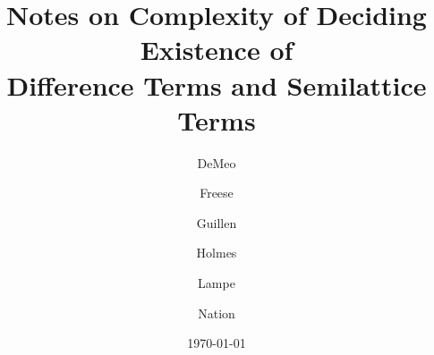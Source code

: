\theoremstyle{plain}
\newtheorem{thm}{Theorem}[section]
\newtheorem{lem}[thm]{Lemma}
\newtheorem{prop}[thm]{Proposition}
\theoremstyle{definition}
\newtheorem{claim}[thm]{Claim}
\newtheorem{cor}[thm]{Corollary}
\newtheorem{definition}[thm]{Definition}
\newtheorem{notation}[thm]{Notation}
\newtheorem{fact}[thm]{Fact}
\newtheorem{question}{Question}
\newtheorem{prob}{Problem}
\newtheorem{example}[thm]{Example}
\newtheorem{examples}[thm]{Examples}
\newtheorem{exercise}{Exercise}
\newtheorem*{rem}{Remark}
\newtheorem*{rems}{Remarks}



\usepackage{inputs/proof-dashed}



\usepackage{inputs/macros}




\title[Difference Terms and Semilattice Terms]{%
  Notes on Complexity of Deciding Existence of \\ Difference Terms and Semilattice Terms}
\date{\today}
\author{DeMeo}
\address{University of Hawaii}
\author{Freese}
\author{Guillen}
\author{Holmes}
\author{Lampe}
\author{Nation}



\maketitle


